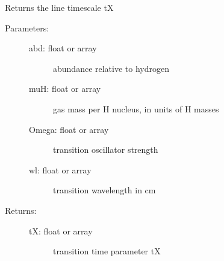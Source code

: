 \documentclass[letterpaper,10pt,english]{sphinxmanual}
\begin{document}
\begin{fulllineitems}
\label{fulldoc:despotic.winds.pwind_util.tX}
Returns the line timescale tX
\begin{description}
\item[{Parameters:}] \leavevmode\begin{description}
\item[{abd: float or array}] \leavevmode
abundance relative to hydrogen

\item[{muH: float or array}] \leavevmode
gas mass per H nucleus, in units of H masses

\item[{Omega: float or array}] \leavevmode
transition oscillator strength

\item[{wl: float or array}] \leavevmode
transition wavelength in cm

\end{description}

\item[{Returns:}] \leavevmode\begin{description}
\item[{tX: float or array}] \leavevmode
transition time parameter tX

\end{description}

\end{description}

\end{fulllineitems}
\end{document}
